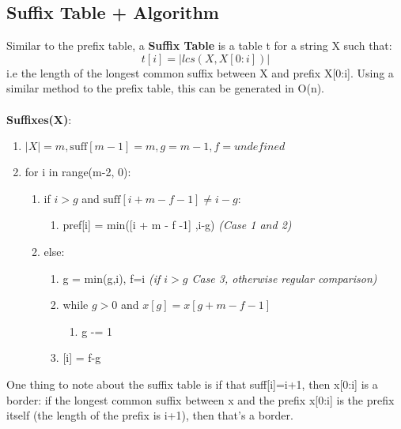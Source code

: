 \subsection{Suffix Table + Algorithm} \label{sec:Suffix_Table}
Similar to the prefix table, a \textbf{Suffix Table} is a table t for a string X such that:
\begin{equation}
    t[i] = | lcs( X, X[0:i]) | \nonumber
\end{equation}
i.e the length of the longest common suffix between X and prefix X[0:i]. Using a similar method to the prefix table, this can be generated in O(n). \\ \\
\textbf{Suffixes(X)}:
\begin{enumerate}[label=\Alph*]
    \item \(|X| = m, \text{suff}[m-1]= m, g = m-1 , f = undefined \)
    \item for i in range(m-2, 0):
\begin{enumerate}[label=\arabic*]
    \item if $ i > g $ and $\text{suff}[i + m - f -1] \neq i-g $:
    \begin{enumerate}
        \item [] pref[i] = min([i + m - f -1] ,i-g) \emph{(Case 1 and 2)}
    \end{enumerate}    
    \item else:
    \begin{enumerate}
        \item g = min(g,i),   f=i \emph{(if $i > g$ Case 3, otherwise regular comparison)}
        \item while \( g > 0 \) and \( x[g] = x[g+m-f-1]\)
        \begin{enumerate}
            \item [] g -= 1 
        \end{enumerate}   
        \item {}[i] = f-g
    \end{enumerate}  
\end{enumerate}    
\end{enumerate}
One thing to note about the suffix table is if that suff[i]=i+1, then x[0:i] is a border: if the longest common suffix between x and the prefix x[0:i] is the prefix itself (the length of the prefix is i+1), then that's a border.

